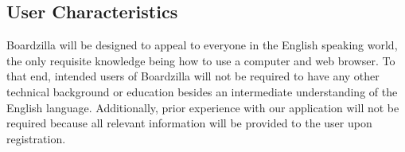 \documentclass[]{article}
\begin{document}
	
	\subsection{User Characteristics}
	\label{sub:user_characteristics}
	Boardzilla will be designed to appeal to everyone in the English speaking world, the only requisite knowledge being how to use a computer and web browser. To that end, intended users of Boardzilla will not be required to have any other technical background or education besides an intermediate understanding of the English language. Additionally, prior experience with our application will not be required because all relevant information will be provided to the user upon registration. 
	
\end{document}
